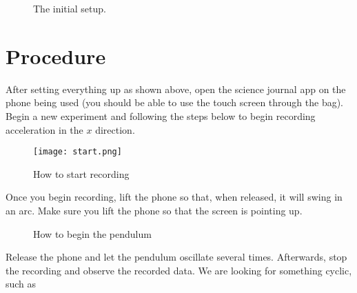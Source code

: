 \documentclass[a4paper]{article}
\begin{document}
\begin{figure}[H]
    \centering
    \caption{The initial setup.}
\end{figure}

\section{Procedure}

After setting everything up as shown above, open the science journal app on the phone being used (you should be able to use the touch screen through the bag). Begin a new experiment and following the steps below to begin recording acceleration in the $x$ direction.

\begin{figure}[H]
    \centering
    \texttt{[image: start.png]}
    \caption{How to start recording}
    \label{fig:my_label}
\end{figure}

Once you begin recording, lift the phone so that, when released, it will swing in an arc. Make sure you lift the phone so that the screen is pointing up.

\begin{figure}[H]
    \centering
    \caption{How to begin the pendulum}
    \label{fig:my_label}
\end{figure}

Release the phone and let the pendulum oscillate several times. Afterwards, stop the recording and observe the recorded data. We are looking for something cyclic, such as 
\end{document}
